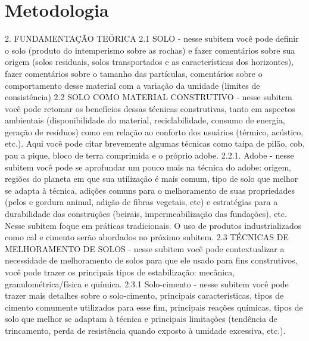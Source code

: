 \newpage

\section[METODOLOGIA]{Metodologia}






2. FUNDAMENTAÇÃO TEÓRICA
2.1 SOLO - nesse subitem você pode definir o solo (produto do intemperismo sobre as rochas) e fazer comentários sobre sua origem (solos residuais, solos transportados e as características dos horizontes), fazer comentários sobre o tamanho das partículas, comentários sobre o comportamento desse material com a variação da umidade (limites de consistência)
2.2 SOLO COMO MATERIAL CONSTRUTIVO - nesse subitem você pode retomar os benefícios dessas técnicas construtivas, tanto em aspectos ambientais (disponibilidade do material, reciclabilidade, consumo de energia, geração de resíduos) como em relação ao conforto dos usuários (térmico, acústico, etc.). Aqui você pode citar brevemente algumas técnicas como taipa de pilão, cob, pau a pique, bloco de terra comprimida e o próprio adobe. 
2.2.1. Adobe - nesse subitem você pode se aprofundar um pouco mais na técnica do adobe: origem, regiões do planeta em que sua utilização é mais comum, tipo de solo que melhor se adapta à técnica, adições comuns para o melhoramento de suas propriedades (pelos e gordura animal, adição de fibras vegetais, etc) e estratégias para a durabilidade das construções (beirais, impermeabilização das fundações), etc. Nesse subitem foque em práticas tradicionais. O uso de produtos industrializados como cal e cimento serão abordados no próximo subitem.
2.3 TÉCNICAS DE MELHORAMENTO DE SOLOS - nesse subitem você pode contextualizar a necessidade de melhoramento de solos para que ele usado para fins construtivos, você pode trazer os principais tipos de estabilização: mecânica, granulométrica/física e química.
2.3.1 Solo-cimento - nesse subitem você pode trazer mais detalhes sobre o solo-cimento, principais características, tipos de cimento comumente utilizados para esse fim, principais reações químicas, tipos de solo que melhor se adaptam à técnica e principais limitações (tendência de trincamento, perda de resistência quando exposto à umidade excessiva, etc.).